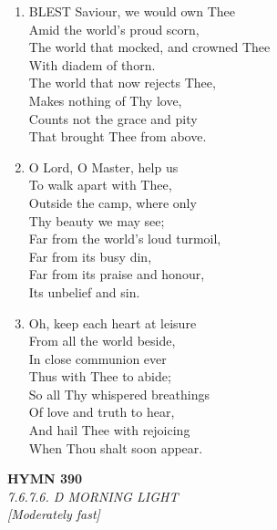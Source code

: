 \documentclass[11pt,a4paper]{article}
\begin{document}
\begin{enumerate}
    \item BLEST Saviour, we would own Thee \\
        Amid the world's proud scorn, \\
        The world that mocked, and crowned Thee \\
        With diadem of thorn. \\
        The world that now rejects Thee, \\
        Makes nothing of Thy love, \\
        Counts not the grace and pity \\
        That brought Thee from above.

    \item O Lord, O Master, help us \\
        To walk apart with Thee, \\
        Outside the camp, where only \\
        Thy beauty we may see; \\
        Far from the world's loud turmoil, \\
        Far from its busy din, \\
        Far from its praise and honour, \\
        Its unbelief and sin.

    \item Oh, keep each heart at leisure \\
        From all the world beside, \\
        In close communion ever \\
        Thus with Thee to abide; \\
        So all Thy whispered breathings \\
        Of love and truth to hear, \\
        And hail Thee with rejoicing \\
        When Thou shalt soon appear.

\end{enumerate}

\newpage
\begin{center}
    {\Large \textbf{HYMN 390}}
    \\
    \textit{7.6.7.6. D MORNING LIGHT}
    \\
    \textit{\small [Moderately fast]}
\end{center}
\vspace{1em}
\end{document}
